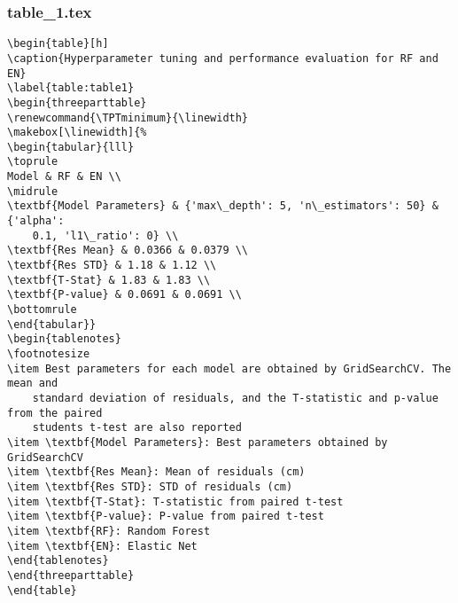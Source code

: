 \documentclass[11pt]{article}
\begin{document}
\subsubsection*{table\_1.tex}

\begin{Verbatim}[tabsize=4]
\begin{table}[h]
\caption{Hyperparameter tuning and performance evaluation for RF and EN}
\label{table:table1}
\begin{threeparttable}
\renewcommand{\TPTminimum}{\linewidth}
\makebox[\linewidth]{%
\begin{tabular}{lll}
\toprule
Model & RF & EN \\
\midrule
\textbf{Model Parameters} & {'max\_depth': 5, 'n\_estimators': 50} & {'alpha':
	0.1, 'l1\_ratio': 0} \\
\textbf{Res Mean} & 0.0366 & 0.0379 \\
\textbf{Res STD} & 1.18 & 1.12 \\
\textbf{T-Stat} & 1.83 & 1.83 \\
\textbf{P-value} & 0.0691 & 0.0691 \\
\bottomrule
\end{tabular}}
\begin{tablenotes}
\footnotesize
\item Best parameters for each model are obtained by GridSearchCV. The mean and
	standard deviation of residuals, and the T-statistic and p-value from the paired
	students t-test are also reported
\item \textbf{Model Parameters}: Best parameters obtained by GridSearchCV
\item \textbf{Res Mean}: Mean of residuals (cm)
\item \textbf{Res STD}: STD of residuals (cm)
\item \textbf{T-Stat}: T-statistic from paired t-test
\item \textbf{P-value}: P-value from paired t-test
\item \textbf{RF}: Random Forest
\item \textbf{EN}: Elastic Net
\end{tablenotes}
\end{threeparttable}
\end{table}

\end{Verbatim}
\end{document}
